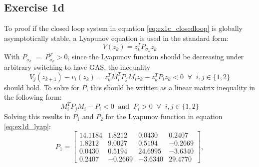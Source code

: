 \subsection{Exercise 1d}
To proof if the closed loop system in equation \eqref{eq:ex1c_closedloop} is globally asymptotically stable, a Lyapunov equation is used in the standard form:
\begin{equation}
    V (z_k) = z_k^T P_{\sigma_k} z_k
    \label{eq:ex1d_lyap}
\end{equation}
With $P_{\sigma_k} \; = \; P_{\sigma_k}^T > 0$, since the Lyapunov function should be decreasing under arbitrary switching to have GAS, the inequality
\begin{equation}
    V_j (z_{k+1}) - v_i (z_k) = z_k^T M_i^T P_j M_i z_k - z_k^T P_i z_k < 0 \; \; \forall\; \; i,j \in \{1,2\}
    \label{eq:ex1d_lyapdecreasing}
\end{equation}
should hold. To solve for $P$, this should be written as a linear matrix inequality in the following form:
\begin{equation}
    M_i^T P_j M_i - P_i < 0 \; \; \text{and} \; \; P_i > 0 \; \; \forall \; \; i,j \in \{1,2\}
\end{equation}
Solving this results in $P_1$ and $P_2$ for the Lyapunov function in equation \eqref{eq:ex1d_lyap}:
\begin{equation}
    P_1 = \begin{bmatrix}
    14.1184 & 1.8212 & 0.0430 & 0.2407 \\
    1.8212 & 9.0027 & 0.5194 & -0.2669 \\
    0.0430 & 0.5194 & 24.6995 & -3.6340 \\
    0.2407 & -0.2669 & -3.6340 & 29.4770 
    \end{bmatrix},
    \label{eq:ex1d_P1}
\end{equation}

